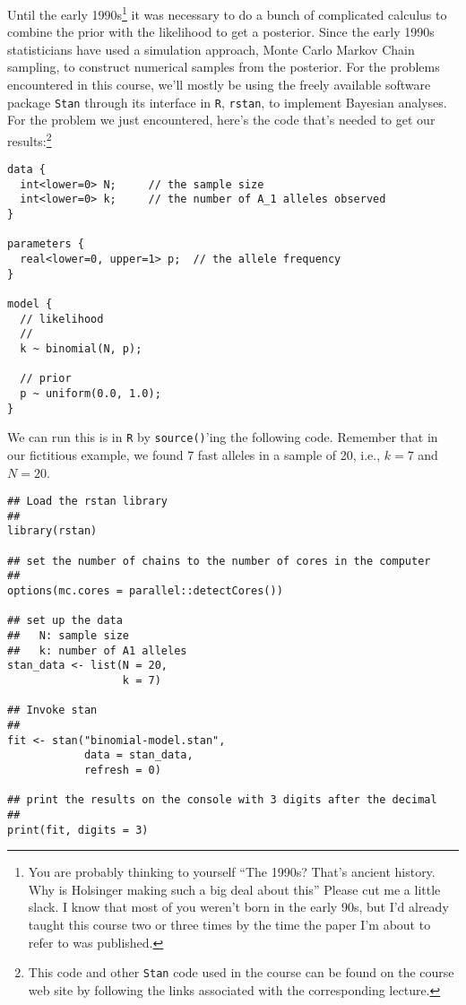 \documentclass[12pt]{article}
\begin{document}
Until the early 1990s\footnote{You are probably thinking to yourself
  ``The 1990s? That's ancient history. Why is Holsinger making such a
  big deal about this'' Please cut me a little slack. I know that most
  of you weren't born in the early 90s, but I'd already taught this
  course two or three times by the time the paper I'm about to refer
  to was published.} it was necessary to do a bunch of complicated
calculus to combine the prior with the likelihood to get a
posterior. Since the early 1990s statisticians have used a simulation
approach, Monte Carlo Markov Chain sampling, to construct numerical
samples from the posterior. For the problems encountered in this
course, we'll mostly be using the freely available software package
{\tt Stan} through its interface in {\tt R}, {\tt rstan}, to implement
Bayesian analyses. For the problem we just encountered, here's the
code that's needed to get our results:\footnote{This code and other
  {\tt Stan} code used in the course can be found on the course web
  site by following the links associated with the corresponding
  lecture.}
\begin{verbatim}
data {
  int<lower=0> N;     // the sample size
  int<lower=0> k;     // the number of A_1 alleles observed
}

parameters {
  real<lower=0, upper=1> p;  // the allele frequency
}

model {
  // likelihood
  //
  k ~ binomial(N, p);

  // prior
  p ~ uniform(0.0, 1.0);
}
\end{verbatim}
We can run this is in {\tt R} by {\tt source()}'ing the following
code. Remember that in our fictitious example, we found 7 fast alleles
in a sample of 20, i.e., $k=7$ and $N=20$.
\begin{verbatim}
## Load the rstan library
##
library(rstan)

## set the number of chains to the number of cores in the computer
##
options(mc.cores = parallel::detectCores())

## set up the data
##   N: sample size
##   k: number of A1 alleles
stan_data <- list(N = 20,
                  k = 7)

## Invoke stan
##
fit <- stan("binomial-model.stan",
            data = stan_data,
            refresh = 0)

## print the results on the console with 3 digits after the decimal
##
print(fit, digits = 3)
\end{verbatim}
\end{document}
